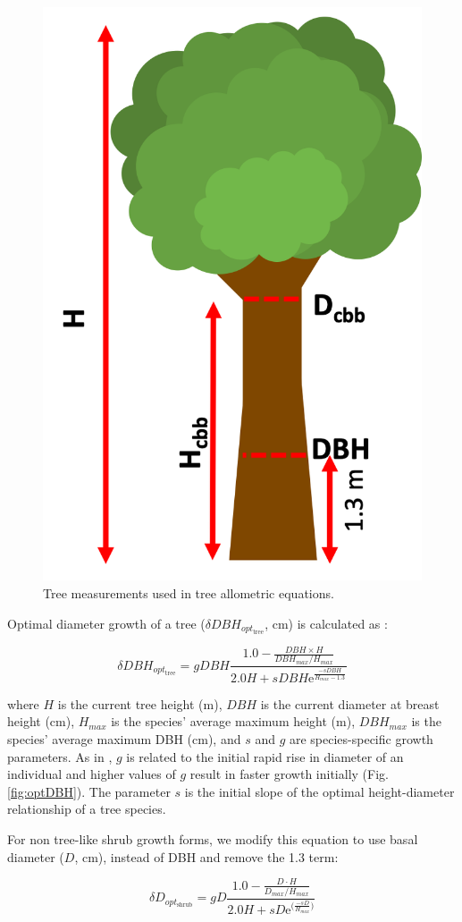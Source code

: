 \documentclass[a4paper, 12pt] {report}
\begin{document}
\begin{figure}
  \includegraphics[width=0.5\linewidth]{Figures/Tree_allometry.png}
  \caption{Tree measurements used in tree allometric equations.}
  \label{fig:allometry}
\end{figure}

Optimal diameter growth of a tree ($\delta DBH_{opt_{\text{tree}}}$, cm) is calculated as \cite{botkinEcologicalConsequencesComputer1972}:

\begin{equation} \label{opt}
\delta DBH_{opt_{\text{tree}}} = gDBH\frac{1.0 - \frac{DBH \times H}{DBH_{max}/H_{max}}}{2.0H + sDBH\text{e}^{\frac{-sDBH}{H_{max} - 1.3}}}
\end{equation}

where $H$ is the current tree height (m), $DBH$ is the current diameter at breast height (cm), $H_{max}$ is the species' average maximum height (m), $DBH_{max}$ is the species' average maximum DBH (cm), and $s$ and $g$ are species-specific growth parameters. As in , $g$ is related to the initial rapid rise in diameter of an individual and higher values of $g$ result in faster growth initially (Fig. \ref{fig:optDBH}). The parameter $s$ is the initial slope of the optimal height-diameter relationship of a tree species. 

For non tree-like shrub growth forms, we modify this equation to use basal diameter ($D$, cm), instead of DBH and remove the 1.3 term:

\begin{equation} \label{opt_shrub}
\delta D_{opt_{\text{shrub}}} = gD\frac{1.0 - \frac{D \cdot H}{D_{max}/H_{max}}}{2.0H + sD\text{e}^{\Big(\frac{-sD}{H_{max}}\Big)}}
\end{equation}
\end{document}
